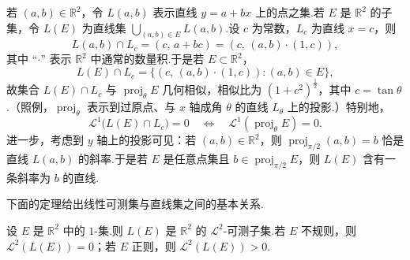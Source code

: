 若 $(a,b)\in\mathbb{R}^2$，令 $L(a,b)$ 表示直线 $y=a+bx$ 上的点之集.若 $E$ 是 $\mathbb{R}^2$ 的子集，令 $L(E)$ 为直线集 $\bigcup_{(a,b)\in E}L(a,b)$.设 $c$ 为常数，$L_c$ 为直线 $x=c$，则
\[
  L(a,b)\cap L_c=(c,\,a+bc)=(c,\,(a,b)\cdot(1,c)),
\]
其中 ``$\cdot$'' 表示 $\mathbb{R}^2$ 中通常的数量积.于是若 $E\subset\mathbb{R}^2$，
\[
  L(E)\cap L_c=\{(c,\,(a,b)\cdot(1,c)):(a,b)\in E\},
\]
故集合 $L(E)\cap L_c$ 与 $\operatorname{proj}_{\theta}E$ 几何相似，相似比为 $(1+c^2)^{\frac{1}{2}}$，其中 $c=\tan\theta$.（照例，$\operatorname{proj}_{\theta}$ 表示到过原点、与 $x$ 轴成角 $\theta$ 的直线 $L_\theta$ 上的投影.）特别地，
\begin{equation}\label{eq:7.1}
  \mathscr{L}^{1}\bigl(L(E)\cap L_c\bigr)=0
  \quad\Longleftrightarrow\quad
  \mathscr{L}^{1}(\operatorname{proj}_{\theta}E)=0.
\end{equation}
进一步，考虑到 $y$ 轴上的投影可见：若 $(a,b)\in\mathbb{R}^2$，则 $\operatorname{proj}_{\pi/2}(a,b)=b$ 恰是直线 $L(a,b)$ 的斜率.于是若 $E$ 是任意点集且 $b\in\operatorname{proj}_{\pi/2}E$，则 $L(E)$ 含有一条斜率为 $b$ 的直线.

下面的定理给出线性可测集与直线集之间的基本关系.

\begin{theorem}\label{thm:7.7}
设 $E$ 是 $\mathbb{R}^2$ 中的 $1$-集.则 $L(E)$ 是 $\mathbb{R}^2$ 的 $\mathscr{L}^2$-可测子集.若 $E$ 不规则，则 $\mathscr{L}^2(L(E))=0$；若 $E$ 正则，则 $\mathscr{L}^2(L(E))>0$.
\end{theorem}

